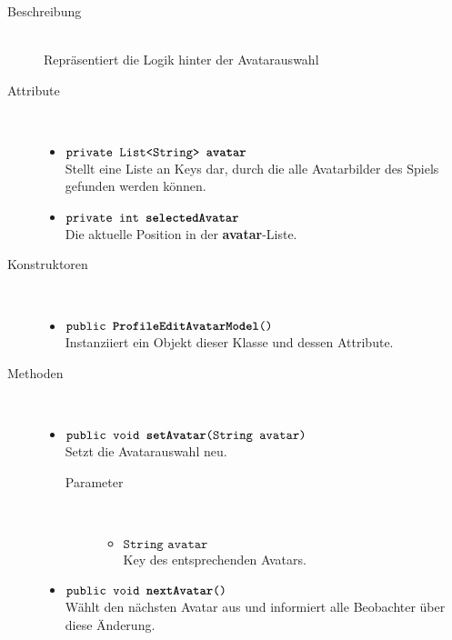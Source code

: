\begin{description}
\item[Beschreibung] \hfill \\ Repräsentiert die Logik hinter der Avatarauswahl

\item[Attribute] \hfill \\
	\vspace{-.8cm}
	\begin{itemize}
		\item $\texttt{private List<String> \textbf{avatar}}$ \\ Stellt eine Liste an Keys dar, durch die alle Avatarbilder des Spiels gefunden werden können.
		\item $\texttt{private int \textbf{selectedAvatar}}$ \\ Die aktuelle Position in der \textbf{avatar}-Liste.
	\end{itemize}
	
\item[Konstruktoren] \hfill \\
	\vspace{-.8cm}
	\begin{itemize}
		\item $\texttt{public \textbf{ProfileEditAvatarModel}()}$ \\ Instanziiert ein Objekt dieser Klasse und dessen Attribute.
	\end{itemize}
	
\item[Methoden] \hfill \\
	\vspace{-.8cm}
	\begin{itemize}		
		\item $\texttt{public void \textbf{setAvatar}(String avatar)}$ \\ Setzt die Avatarauswahl neu.
		\begin{description}
			\item[Parameter] \hfill \\
			\vspace{-.8cm}
			\begin{itemize}
				\item $\texttt{String avatar}$ \\ Key des entsprechenden Avatars.
			\end{itemize}
		\end{description}
		
		\item $\texttt{public void \textbf{nextAvatar}()}$ \\ Wählt den nächsten Avatar aus und informiert alle Beobachter über diese Änderung.
		

\end{itemize}
\end{description}
